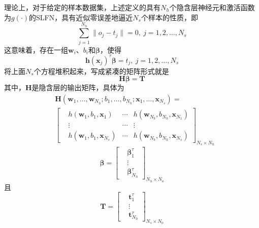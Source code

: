 理论上，对于给定的样本数据集，上述定义的具有$N_{h}$个隐含层神经元和激活函数为$g(\cdot)$的SLFN，具有近似零误差地逼近$N_{s}$个样本的性质，即
\begin{equation*}
\sum_{j=1}^{N_{h}}\|o_{j}-t_{j}\|=0,\ j=1,2,\dots,N_{s}
\end{equation*}
这意味着，存在一组$\bm{w}_{i}$、$b_{i}$和$\bm{\beta}$，使得
\begin{equation}
\bm{h}(\bm{x}_{j})^{\tau}\bm{\beta}=t_{j},\ j=1,2,\dots,N_{s}
\end{equation}
将上面$N_{s}$个方程堆积起来，写成紧凑的矩阵形式就是
\begin{equation}\label{eq:4.nn.HT}
\bm{H}\bm{\beta}=\bm{T}
\end{equation}
其中，$\bm{H}$是隐含层的输出矩阵，具体为
\begin{equation}\label{eq:4.nn.H}
\begin{split}
&\bm{H}(\bm{w}_{1},\dots,\bm{w}_{N_{h}};b_{1},\dots,b_{N_{h}};\bm{x}_{1},\dots,\bm{x}_{N_{s}})=\\
&\begin{bmatrix}
&h(\bm{w}_{1},b_{1},\bm{x}_{1}) &\cdots &h(\bm{w}_{N_{b}},b_{N_{h}},\bm{x}_{N_{1}})\\
&\vdots &\cdots & \vdots\\
&h(\bm{w}_{1},b_{1},\bm{x}_{N_{s}}) &\cdots &h(\bm{w}_{N_{b}},b_{N_{h}},\bm{x}_{N_{s}})
\end{bmatrix}_{N_{s}\times N_{h}}
\end{split}
\end{equation}
\begin{equation}\label{eq:4.nn.beta}
\bm{\beta} = \begin{bmatrix}%
&\bm{\beta}_{1}^{\tau}\\
&\vdots\\
&\bm{\beta}_{N_{h}}^{\tau}
\end{bmatrix}_{N_{h}\times N_{o}}
\end{equation}
且
\begin{equation}\label{eq:4.nn.T}
\bm{T} = \begin{bmatrix}%
&\bm{t}_{1}^{\tau}\\
&\vdots\\
&\bm{t}_{N_{h}}^{\tau}
\end{bmatrix}_{N_{s}\times N_{o}}
\end{equation}

